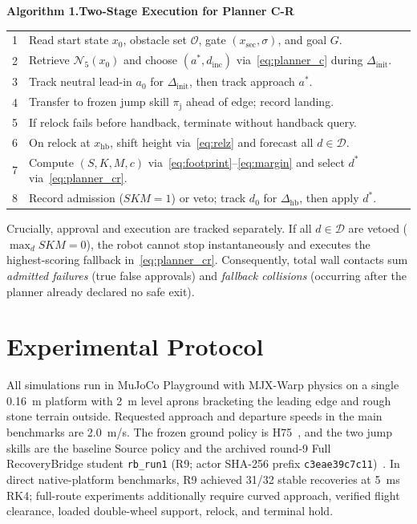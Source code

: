 \documentclass[letterpaper,10pt,conference]{ieeeconf}
\begin{document}
\begin{table}[t]\centering
{\bfseries Algorithm 1.\quad Two-Stage Execution for Planner C-R}\par\smallskip
\footnotesize\begin{tabular}{r p{}}
\toprule
1 & Read start state $x_0$, obstacle set $\mathcal{O}$, gate $(x_{\mathrm{sec}},\sigma)$, and goal $G$.\\
2 & Retrieve $\mathcal{N}_5(x_0)$ and choose $(a^*,d_{\mathrm{inc}})$ via~\eqref{eq:planner_c} during $\Delta_{\mathrm{init}}$.\\
3 & Track neutral lead-in $a_0$ for $\Delta_{\mathrm{init}}$, then track approach $a^*$.\\
4 & Transfer to frozen jump skill $\pi_{\mathrm{j}}$ ahead of edge; record landing.\\
5 & If relock fails before handback, terminate without handback query.\\
6 & On relock at $x_{\mathrm{hb}}$, shift height via~\eqref{eq:relz} and forecast all $d\in\mathcal{D}$.\\
7 & Compute $(S,K,M,c)$ via~\eqref{eq:footprint}--\eqref{eq:margin} and select $d^*$ via~\eqref{eq:planner_cr}.\\
8 & Record admission ($S K M=1$) or veto; track $d_0$ for $\Delta_{\mathrm{hb}}$, then apply $d^*$.\\
\bottomrule
\end{tabular}
\end{table}

Crucially, approval and execution are tracked separately. If all $d\in\mathcal{D}$ are vetoed ($\max_d S K M = 0$), the robot cannot stop instantaneously and executes the highest-scoring fallback in~\eqref{eq:planner_cr}. Consequently, total wall contacts sum \emph{admitted failures} (true false approvals) and \emph{fallback collisions} (occurring after the planner already declared no safe exit).

\section{Experimental Protocol}
All simulations run in MuJoCo Playground with MJX-Warp physics on a single 0.16~m platform with 2~m level aprons bracketing the leading edge and rough stone terrain outside. Requested approach and departure speeds in the main benchmarks are 2.0~m/s. The frozen ground policy is H75~\cite{sttw}, and the two jump skills are the baseline Source policy and the archived round-9 Full RecoveryBridge student \texttt{rb\_run1} (R9; actor SHA-256 prefix \texttt{c3eae39c7c11})~\cite{rb}. In direct native-platform benchmarks, R9 achieved 31/32 stable recoveries at 5~ms RK4; full-route experiments additionally require curved approach, verified flight clearance, loaded double-wheel support, relock, and terminal hold.
\end{document}

